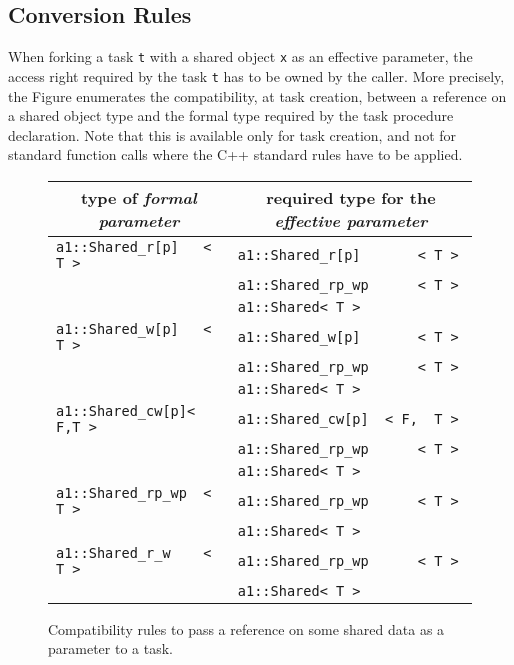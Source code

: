 \subsection{Conversion Rules}\label{sec:shd_conv}

When forking a task {\tt t}  with a shared object {\tt x}  as an effective parameter, the access right required by the task 
{\tt t}  has to be owned by the caller.	More precisely, the Figure  enumerates the compatibility, 
at task creation, between a reference on a shared object type and the formal type required by the task procedure 
declaration. Note that this is available only for task creation, and not for standard function calls where the C++ 
standard rules have to be applied. 

\begin{figure}[htbp]
\begin{center}
\begin{tabular}[t]{|l|l|}\hline
\multicolumn{1}{|c|}{type of {\em formal parameter}} &
\multicolumn{1}{|c|}{required type for the {\em effective parameter}} \\\hline
\verb!a1::Shared_r[p]   < T >! & \verb!a1::Shared_r[p]       < T >!\\
                            & \verb!a1::Shared_rp_wp      < T >!\\
                            & \verb!a1::Shared< T >!\\\hline
\verb!a1::Shared_w[p]   < T >! & \verb!a1::Shared_w[p]       < T >!\\
                            & \verb!a1::Shared_rp_wp      < T >!\\
                            & \verb!a1::Shared< T >!\\\hline
\verb!a1::Shared_cw[p]< F,T >!
                            & \verb!a1::Shared_cw[p]  < F,  T >!\\
                            & \verb!a1::Shared_rp_wp      < T >!\\
                            & \verb!a1::Shared< T >!\\\hline
\verb!a1::Shared_rp_wp  < T >! & \verb!a1::Shared_rp_wp      < T >!\\
                            & \verb!a1::Shared< T >!\\\hline
\verb!a1::Shared_r_w    < T >!  & \verb!a1::Shared_rp_wp      < T >!\\
                            & \verb!a1::Shared< T >!\\\hline
\end{tabular}
\end{center}
\caption{Compatibility rules to pass a
reference on some shared data as a parameter to a task.}
\label{fig:shd_compat}
\end{figure}

